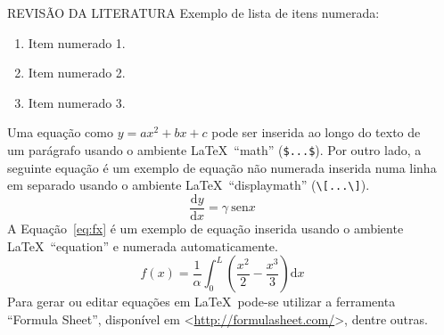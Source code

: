 \documentclass[final]{beamer}
\begin{document}
\begin{frame}[t, fragile = singleslide]{}
\begin{columns}[t]
\begin{column}{0.45\textwidth}
\begin{block}{REVISÃO DA LITERATURA}
Exemplo de lista de itens numerada:
\begin{enumerate}
\item Item numerado 1.
\item Item numerado 2.
\item Item numerado 3.
\end{enumerate}
Uma equação como $y = a x^2 + b x + c$ pode ser inserida ao longo do texto de um parágrafo usando o ambiente \LaTeX\ ``math'' (\verb|$...$|). Por outro lado, a seguinte equação é um exemplo de equação não numerada inserida numa linha em separado usando o ambiente \LaTeX\ ``displaymath'' (\verb|\[...\]|).
\[
\frac{\mathrm{d}y}{\mathrm{d}x} = \gamma \ \mathrm{sen} x
\]
A Equação~\eqref{eq:fx} é um exemplo de equação inserida usando o ambiente \LaTeX\ ``equation'' e numerada automaticamente.
\begin{equation}\label{eq:fx}
f(x) = \frac{1}{\alpha} \int^L_0 \left(\frac{x^2}{2} - \frac{x^3}{3}\right) \mathrm{d}x
\end{equation}
Para gerar ou editar equações em \LaTeX\ pode-se utilizar a ferramenta ``Formula Sheet'', disponível em <\url{http://formulasheet.com/}>, dentre outras.
\end{block}

\end{column}

\begin{column}{0.45\textwidth}


\end{column}
\end{columns}
\end{frame}
\end{document}
